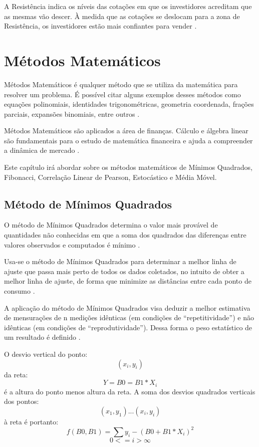 A Resistência indica os níveis das cotações em que os investidores acreditam que as mesmas vão descer. À medida que as cotações se deslocam para a zona de Resistência, os investidores estão mais confiantes para vender \cite{collins2012}.

\section{Métodos Matemáticos}

Métodos Matemáticos é qualquer método que se utiliza da matemática para resolver um problema. É possível citar alguns exemplos desses métodos como equações polinomiais, identidades trigonométricas, geometria coordenada, frações parciais, expansões binomiais, entre outros \cite{riley2011}.

Métodos Matemáticos são aplicados a área de finanças. Cálculo e álgebra linear são fundamentais para o estudo de matemática financeira e ajuda a compreender a dinâmica de mercado \cite{konis2014}.

Este capítulo irá abordar sobre os métodos matemáticos de Mínimos Quadrados, Fibonacci, Correlação Linear de Pearson, Estocástico e Média Móvel.
\subsection{Método de Mínimos Quadrados}

O método de Mínimos Quadrados determina o valor mais provável de quantidades não conhecidas em que a soma dos quadrados das diferenças entre valores observados e computados é mínimo \cite[pág.~72]{inacio2010}.

Usa-se o método de Mínimos Quadrados para determinar a melhor linha de ajuste que passa mais perto de todos os dados coletados, no intuito de obter a melhor linha de ajuste, de forma que minimize as distâncias entre cada ponto de consumo \cite[pág.~46]{dias1985}.

A aplicação do método de Mínimos Quadrados visa deduzir a melhor estimativa de mensurações de n medições idênticas (em condições de “repetitividade”) e não idênticas (em condições de “reprodutividade”). Dessa forma o peso estatístico de um resultado é definido \cite[pág.~149]{vuolo1996}.

O desvio vertical do ponto:
\begin{equation}
(x_{i}, y_{i})
\end{equation}
da reta:
\begin{equation}
Y = B0 = B1*X_{i}
\end{equation}
é a altura do ponto menos altura da reta. A soma dos desvios quadrados verticais dos pontos:
\begin{equation}
(x_{1}, y_{1})...(x_{i}, y_{i})
\end{equation}
à reta é portanto:
\begin{equation}
f(B0,B1) = \sum{y_{i} - (B0 + B1 * X_{i})}^2
\end{equation}
\begin{equation}
0 <= i > \infty
\end{equation}

